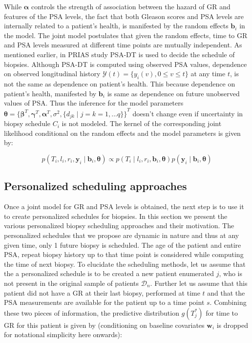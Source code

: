 While $\boldsymbol{\alpha}$ controls the strength of association between the hazard of GR and features of the PSA levels, the fact that both Gleason scores and PSA levels are internally related to a patient's health, is manifested by the random effects $\boldsymbol{b}_i$ in the model. The joint model postulates that given the random effects, time to GR and PSA levels measured at different time points are mutually independent. As mentioned earlier, in PRIAS study PSA-DT is used to decide the schedule of biopsies. Although PSA-DT is computed using observed PSA values, dependence on observed longitudinal history $\mathcal{Y}(t) = \{y_i(v), 0\leq v \leq t\}$ at any time $t$, is not the same as dependence on patient's health. This because dependence on patient's health, manifested by $\boldsymbol{b}_i$ is same as dependence on future unobserved values of PSA. Thus the inference for the model parameters $\boldsymbol{\theta} = {\{\boldsymbol{\beta}^T, \boldsymbol{\gamma}^T, \boldsymbol{\alpha}^T, \sigma^2, \{d_{jk} \mid j=k=1,...q\}\}}^T$ doesn't change even if uncertainty in biopsy schedule $C_i$ is not modeled. The kernel of the corresponding joint likelihood conditional on the random effects and the model parameters is given by:

\begin{equation*}
p(T_i, l_i, r_i, \boldsymbol{y}_i \mid \boldsymbol{b}_i, \boldsymbol{\theta}) \propto p(T_i \mid l_i, r_i, \boldsymbol{b}_i, \boldsymbol{\theta}) p(\boldsymbol{y}_i \mid \boldsymbol{b}_i, \boldsymbol{\theta})
\end{equation*}

\subsection{Personalized scheduling approaches}
\label{subsec : pers_sched_approaches}
Once a joint model for GR and PSA levels is obtained, the next step is to use it to create personalized schedules for biopsies. In this section we present the various personalized biopsy scheduling approaches and their motivation. The personalized schedules that we propose are dynamic in nature and thus at any given time, only 1 future biopsy is scheduled. The age of the patient and entire PSA, repeat biopsy history up to that time point is considered while computing the time of next biopsy. To elucidate the scheduling methods, let us assume that the a personalized schedule is to be created a new patient enumerated $j$, who is not present in the original sample of patients $\mathcal{D}_n$. Further let us assume that this patient did not have a GR at their last biopsy, performed at time $t$ and that the PSA measurements are available for the patient up to a time point $s$. Combining these two pieces of information, the predictive distribution $g(T^*_j)$ for time to GR for this patient is given by (conditioning on baseline covariates $\boldsymbol{w}_i$ is dropped for notational simplicity here onwards):

